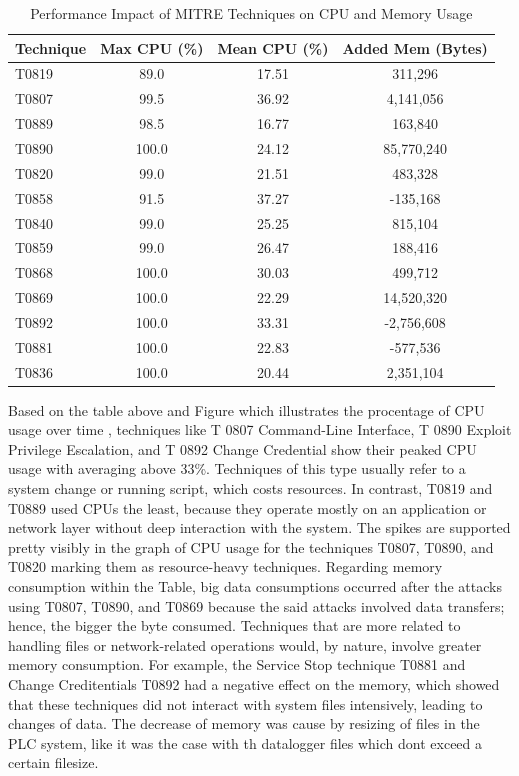\documentclass[Master,BMR,english]{twbook}
\begin{document}
\begin{table}[!htbp]
\centering
\begin{tabular}{|l|c|c|c|}
\hline
\textbf{Technique} & \textbf{Max CPU (\%)} & \textbf{Mean CPU (\%)} & \textbf{Added Mem (Bytes)} \\
\hline
T0819 & 89.0 & 17.51 & 311,296 \\
T0807 & 99.5 & 36.92 & 4,141,056 \\
T0889 & 98.5 & 16.77 & 163,840 \\
T0890 & 100.0 & 24.12 & 85,770,240 \\
T0820 & 99.0 & 21.51 & 483,328 \\
T0858 & 91.5 & 37.27 & -135,168 \\
T0840 & 99.0 & 25.25 & 815,104 \\
T0859 & 99.0 & 26.47 & 188,416 \\
T0868 & 100.0 & 30.03 & 499,712 \\
T0869 & 100.0 & 22.29 & 14,520,320 \\
T0892 & 100.0 & 33.31 & -2,756,608 \\
T0881 & 100.0 & 22.83 & -577,536 \\
T0836 & 100.0 & 20.44 & 2,351,104 \\
\hline
\end{tabular}
\caption{Performance Impact of MITRE Techniques on CPU and Memory Usage}
\label{tab:mitre_perf}
\end{table}
Based on the table above and Figure which illustrates the procentage of CPU usage over time , techniques like T 0807 Command-Line Interface, T 0890 Exploit Privilege Escalation, and T 0892 Change Credential show their peaked CPU usage with averaging above 33\%. Techniques of this type usually refer to a system change or running script, which costs resources. In contrast, T0819 and T0889 used CPUs the least, because they operate mostly on an application or network layer without deep interaction with the system. The spikes are supported pretty visibly in the graph of CPU usage for the techniques T0807, T0890, and T0820 marking them as resource-heavy techniques. Regarding memory consumption within the Table, big data consumptions occurred after the attacks using T0807, T0890, and  T0869 because the said attacks involved  data transfers; hence, the bigger the byte consumed. Techniques that are more related to handling files or network-related operations would, by nature, involve greater memory consumption. For example, the Service Stop technique T0881 and Change Creditentials T0892 had a negative effect on the memory, which showed that these techniques did not interact with system files intensively, leading to changes of data. The decrease of memory was cause by resizing of files in the PLC system, like it was the case with th datalogger files which dont exceed a certain filesize.
\end{document}
